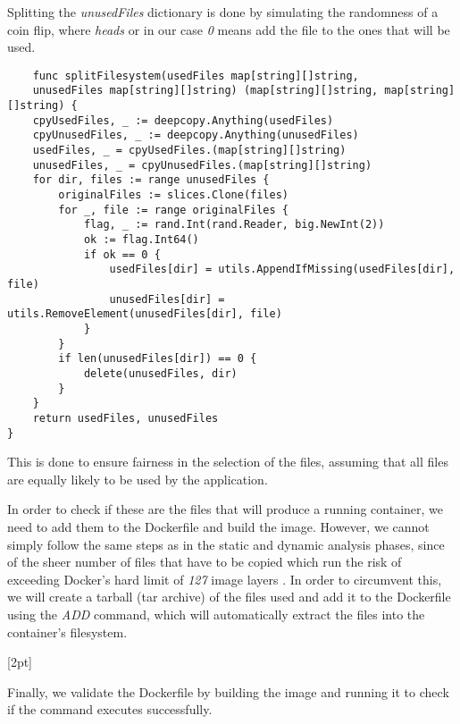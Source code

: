 Splitting the \textit{unusedFiles} dictionary is done by simulating the randomness of a coin flip, where \textit{heads} or in our case \textit{0} means add the file to the ones
that will be used.
\lstset{language=Go,caption=Splitting the filesystem,label=lst:split-filesystem}
\begin{lstlisting}
	func splitFilesystem(usedFiles map[string][]string,
	unusedFiles map[string][]string) (map[string][]string, map[string][]string) {
	cpyUsedFiles, _ := deepcopy.Anything(usedFiles)
	cpyUnusedFiles, _ := deepcopy.Anything(unusedFiles)
	usedFiles, _ = cpyUsedFiles.(map[string][]string)
	unusedFiles, _ = cpyUnusedFiles.(map[string][]string)
	for dir, files := range unusedFiles {
		originalFiles := slices.Clone(files)
		for _, file := range originalFiles {
			flag, _ := rand.Int(rand.Reader, big.NewInt(2))
			ok := flag.Int64()
			if ok == 0 {
				usedFiles[dir] = utils.AppendIfMissing(usedFiles[dir], file)
				unusedFiles[dir] = utils.RemoveElement(unusedFiles[dir], file)
			}
		}
		if len(unusedFiles[dir]) == 0 {
			delete(unusedFiles, dir)
		}
	}
	return usedFiles, unusedFiles
}
\end{lstlisting}

This is done to ensure fairness in the selection of the files, assuming that all files are equally likely to be used by the application.

In order to check if these are the files that will produce a running container, we need to add them to the Dockerfile and build the image. However, we cannot simply follow the 
same steps as in the static and dynamic analysis phases, since of the sheer number of files that have to be copied which run the risk of exceeding Docker's hard limit of \textit{127} image layers
\cite{docker-layers}. In order to circumvent this, we will create a tarball (tar archive) of the files used and add it to the Dockerfile using the \textit{ADD} command, which will automatically extract the files 
into the container's filesystem.

[2pt]

Finally, we validate the Dockerfile by building the image and running it to check if the command executes successfully. 